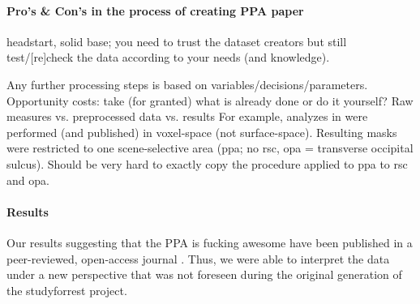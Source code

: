 \paragraph{Pro's \& Con's in the process of creating PPA paper}

%
headstart, solid base;
%
you need to trust the dataset creators but still test/[re]check the data
according to your needs (and knowledge).

%
Any further processing steps is based on variables/decisions/parameters.
%
Opportunity costs: take (for granted) what is already done or do it yourself?
%
Raw measures vs. preprocessed data vs. results
%
For example, analyzes in \citet{sengupta2016extension} were performed (and
published) in voxel-space (not surface-space).
%
Resulting masks were restricted to one scene-selective area (\ac{ppa}; no
\ac{rsc}, \ac{opa} = transverse occipital sulcus).
%
Should be very hard to exactly copy the procedure applied to \ac{ppa} to
\ac{rsc} and \ac{opa}.


\paragraph{Results}


Our results suggesting that the PPA is fucking awesome have been published in a
peer-reviewed, open-access journal \citep{haeusler2022processing}.
Thus, we were able to interpret the data under a new perspective that was not
foreseen during the original generation of the studyforrest project.

